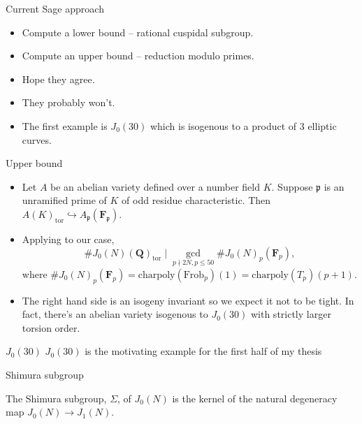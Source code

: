 \documentclass{beamer}
\newcommand{\QQ}{\mathbf{Q}}
\newcommand{\FF}{\mathbf{F}}
\newcommand{\tor}{\mathrm{tor}}
\newcommand{\Frob}{\mathrm{Frob}}
\newcommand{\p}{\mathfrak{p}}
\begin{document}
\begin{frame}{Current Sage approach}
    \begin{itemize}
        \item
            Compute a lower bound -- rational cuspidal subgroup.
        \item
            Compute an upper bound -- reduction modulo primes.
        \item
            Hope they agree. 
        \item
            They probably won't.
        \item
            The first example is $J_0(30)$ which is
            isogenous to a product of 3 elliptic curves.
    \end{itemize}
\end{frame}

\begin{frame}{Upper bound}
    \begin{itemize}
        \item 
            Let $A$ be an abelian variety defined over a number field $K$.
            Suppose $\p$ is an unramified prime of $K$ of odd residue
            characteristic. Then $A(K)_\tor \hookrightarrow A_\p(\FF_\p)$.
        \item
            Applying to our case,
            \[
                \#J_0(N)(\QQ)_\tor \mid  \gcd_{p\nmid 2N, p\leq 50} \#J_0(N)_p
                (\FF_p),
            \]
            where $\# J_0(N)_p(\FF_p)=\mathrm{charpoly}(\Frob_p)(1)
            =\mathrm{charpoly}(T_p)(p+1)$.
        \item
            The right hand side is an isogeny invariant so we expect it not to
            be tight. In fact, there's an abelian variety isogenous to
            $J_0(30)$ with strictly larger torsion order.
    \end{itemize}
\end{frame}

\begin{frame}{$J_0(30)$}
    \Large{$J_0(30)$ is the motivating example for the first half of my thesis}
\end{frame}

\begin{frame}{Shimura subgroup}
    \begin{definition}
        The Shimura subgroup, $\Sigma$, of $J_0(N)$ is the kernel of the
        natural degeneracy map $J_0(N)\to J_1(N)$.
    \end{definition}
\end{frame}
\end{document}
